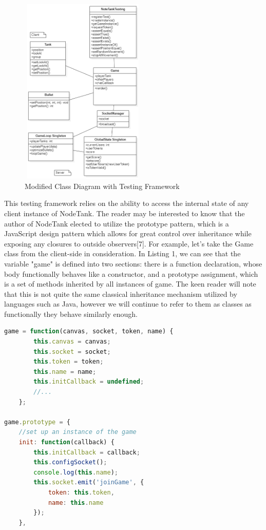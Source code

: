 \documentclass[conference]{IEEEtran}
\begin{document}
\begin{figure}[htbp]
\centerline{\includegraphics [width = 6cm, height = 9cm] {classv2.PNG}}
\caption{Modified Class Diagram with Testing Framework}
\end{figure}

This testing framework relies on the ability to access the internal state of any client instance of NodeTank. The reader may be interested to know that the author of NodeTank 
elected to utilize the prototype pattern, which is a JavaScript design pattern which allows for great control over inheritance while exposing any closures to outside observers[7]. For example, 
let's take the Game class from the client-side in consideration. In Listing 1, we can see that the variable "game" is defined into two sections: there is a function declaration, whose body functionally 
behaves like a constructor, and a prototype assignment, which is a set of methods inherited by all instances of game. The keen reader will note that this is not quite the same classical inheritance
mechanism utilized by languages such as Java, however we will continue to refer to them as classes as functionally they behave similarly enough.

\begin{lstlisting}[language=JavaScript,caption={Snippet of the Game Class}]
    game = function(canvas, socket, token, name) {
		this.canvas = canvas;
		this.socket = socket;
		this.token = token;
		this.name = name;
		this.initCallback = undefined;
		//...
	};

game.prototype = {
    //set up an instance of the game
    init: function(callback) {
        this.initCallback = callback;
        this.configSocket();
        console.log(this.name);
        this.socket.emit('joinGame', {
            token: this.token,
            name: this.name
        });
    },
\end{lstlisting}
\end{document}
